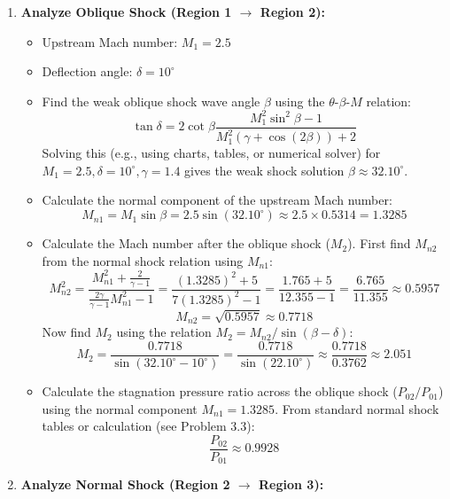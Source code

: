 \begin{enumerate}
\def\labelenumi{\arabic{enumi}.}
\tightlist
\item
  \textbf{Analyze Oblique Shock (Region 1 \(\to\) Region 2):}

  \begin{itemize}
  \tightlist
  \item
    Upstream Mach number: \(M_1 = 2.5\)
  \item
    Deflection angle: \(\delta = 10^\circ\)
  \item
    Find the weak oblique shock wave angle \(\beta\) using the
    \(\theta\)-\(\beta\)-\(M\) relation:
    \[ \tan\delta = 2 \cot\beta \frac{M_1^2 \sin^2\beta - 1}{M_1^2 (\gamma + \cos(2\beta)) + 2} \]
    Solving this (e.g., using charts, tables, or numerical solver) for
    \(M_1=2.5, \delta=10^\circ, \gamma=1.4\) gives the weak shock
    solution \(\beta \approx 32.10^\circ\).
  \item
    Calculate the normal component of the upstream Mach number:
    \[ M_{n1} = M_1 \sin\beta = 2.5 \sin(32.10^\circ) \approx 2.5 \times 0.5314 = 1.3285 \]
  \item
    Calculate the Mach number after the oblique shock (\(M_2\)). First
    find \(M_{n2}\) from the normal shock relation using \(M_{n1}\):
    \[ M_{n2}^2 = \frac{M_{n1}^2 + \frac{2}{\gamma - 1}}{\frac{2\gamma}{\gamma - 1}M_{n1}^2 - 1} = \frac{(1.3285)^2 + 5}{7(1.3285)^2 - 1} = \frac{1.765 + 5}{12.355 - 1} = \frac{6.765}{11.355} \approx 0.5957 \]
    \[ M_{n2} = \sqrt{0.5957} \approx 0.7718 \] Now find \(M_2\) using
    the relation \(M_2 = M_{n2} / \sin(\beta - \delta)\):
    \[ M_2 = \frac{0.7718}{\sin(32.10^\circ - 10^\circ)} = \frac{0.7718}{\sin(22.10^\circ)} \approx \frac{0.7718}{0.3762} \approx 2.051 \]
  \item
    Calculate the stagnation pressure ratio across the oblique shock
    (\(P_{02}/P_{01}\)) using the normal component \(M_{n1}=1.3285\).
    From standard normal shock tables or calculation (see Problem 3.3):
    \[ \frac{P_{02}}{P_{01}} \approx 0.9928 \]
  \end{itemize}
\item
  \textbf{Analyze Normal Shock (Region 2 \(\to\) Region 3):}


\end{enumerate}
